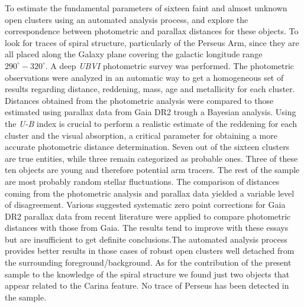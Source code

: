 \documentclass[draft]{aa}
\begin{document}
\abstract
{}
{To estimate the fundamental parameters of sixteen faint and almost unknown
open clusters using an automated analysis process, and explore the
correspondence between photometric and parallax distances for these objects.
To look for traces of spiral structure, particularly of the Perseus Arm, since
they are all placed along the Galaxy plane covering the galactic longitude
range $290^\circ-320^\circ$.}
{A deep \textit{UBVI} photometric survey was performed. The photometric
observations were analyzed in an automatic way to get a homogeneous set of
results regarding distance, reddening, mass, age and metallicity for each
cluster. Distances obtained from the photometric analysis were compared to
those estimated using parallax data from Gaia DR2 trough a Bayesian
analysis. Using the \textit{U-B} index is crucial to perform a realistic
estimate of the reddening for each cluster and the visual absorption, a
critical parameter for obtaining a more accurate photometric distance
determination.}
{Seven out of the sixteen clusters are true entities, while three
remain categorized as probable ones. Three of these ten objects are
young and therefore potential arm tracers. The rest of the sample are most
probably random stellar fluctuations. The comparison of distances coming from
the photometric analysis and parallax data yielded a variable level of
disagreement.
%
%
}
%
{Various suggested systematic zero point corrections for Gaia DR2 parallax data
from recent literature were applied to compare photometric distances with those
from Gaia. The results tend to improve with these essays but are insufficient
to get definite conclusions.The automated analysis process provides better
results in those cases of robust open clusters well detached from the
surrounding foreground/background.
As for the contribution of the present sample to the knowledge of the spiral
structure we found just two objects that appear related to the
Carina feature. No trace of Perseus has been detected in the sample.}

\end{document}
